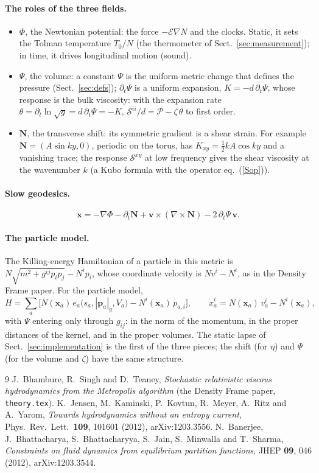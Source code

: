 \documentclass[11pt,aps,preprint,nofootinbib,superscriptaddress,tightenlines]{revtex4-2}
\def\edense{{\mathcal{E}}}
\def\Sstress{{\mathcal S}}
\def\pr{{\mathcal P}}
\def\st{\begin{equation}}
\def\stp{\end{equation}}
\def\Eq#1{eq.~(\ref{#1})}
\def\Sect#1{Sect.~\ref{#1}}
\let\oldparagraph\paragraph
\renewcommand{\paragraph}{\par\bigskip\oldparagraph}
\begin{document}
\paragraph{The roles of the three fields.}
\begin{itemize}
\item $\Phi$, the Newtonian potential: the force $-\edense\nabla N$ and the clocks.  Static, it sets the Tolman temperature $T_0/N$ (the thermometer of \Sect{sec:measurement}); in
  time, it drives longitudinal motion (sound).
\item $\Psi$, the volume: a constant $\Psi$ is the uniform metric change that defines the pressure (\Sect{sec:defs}); $\partial_t\Psi$ is a uniform expansion, $K=-d\,\partial_t\Psi$,
  whose response is the bulk viscosity: with the expansion rate $\theta=\partial_t\ln\sqrt g=d\,\partial_t\Psi=-K$, $\Sstress^{ii}/d=\pr-\zeta\,\theta$ to first order.
\item $\bm N$, the transverse shift: its symmetric gradient is a shear strain.  For example $\bm N=(A\sin ky,0)$, periodic on the torus, has
  $K_{xy}=\tfrac12kA\cos ky$ and a vanishing trace; the response $\Sstress^{xy}$ at low frequency gives the shear viscosity at the wavenumber $k$ (a Kubo formula with the
  operator \Eq{Sop}).
\end{itemize}

\paragraph{Slow geodesics.}
\st
\ddot{\bm x}=-\nabla\Phi-\partial_t\bm N+\bm v\times(\nabla\times\bm N)-2\,\partial_t\Psi\,\bm v .
\stp

\paragraph{The particle model.}  The Killing-energy Hamiltonian of a particle in this metric is $N\sqrt{m^2+g^{ij}p_ip_j}-N^ip_i$, whose coordinate velocity is
$N v^i-N^i$, as in the Density Frame paper.  For the particle model,
\st
H=\sum_a\Big[N(\bm x_a)\,e_a\big(s_a,|\bm p_a|_g,V_a\big)-N^i(\bm x_a)\,p_{a,i}\Big],\qquad \dot x_a^i=N(\bm x_a)\,v_a^i-N^i(\bm x_a) ,
\stp
with $\Psi$ entering only through $g_{ij}$: in the norm of the momentum, in the proper distances of the kernel, and in the proper volumes.  The static lapse of
\Sect{sec:implementation} is the first of the three pieces; the shift (for $\eta$) and $\Psi$ (for the volume and $\zeta$) have the same structure.

\begin{thebibliography}{9}
 J.~Bhambure, R.~Singh and D.~Teaney, \emph{Stochastic relativistic viscous hydrodynamics from the Metropolis algorithm} (the Density Frame
  paper, \texttt{theory.tex}).
 K.~Jensen, M.~Kaminski, P.~Kovtun, R.~Meyer, A.~Ritz and A.~Yarom, \emph{Towards hydrodynamics without an entropy current},
  Phys.\ Rev.\ Lett.\ \textbf{109}, 101601 (2012), arXiv:1203.3556.
 N.~Banerjee, J.~Bhattacharya, S.~Bhattacharyya, S.~Jain, S.~Minwalla and T.~Sharma, \emph{Constraints on fluid dynamics from equilibrium
  partition functions}, JHEP \textbf{09}, 046 (2012), arXiv:1203.3544.
\end{thebibliography}
\end{document}
